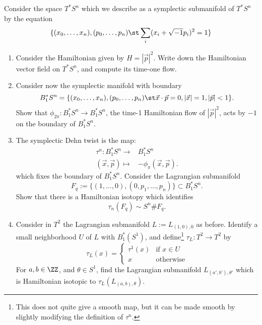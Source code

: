 
 
 
Consider the space $T^*S^n$ which we describe as a symplectic submanifold of $T^*S^n$ by the equation
\[\{(x_0, \ldots, x_n), (p_0, \ldots, p_n) \st \sum_{i} (x_i+\sqrt{-1} p_i)^2=1 \}\]
\begin{enumerate}
    \item Consider the Hamiltonian given by $H=|\vec p|^2$. Write down the Hamiltonian vector field on $T^*S^n$, and compute its time-one flow.
    \item Consider now the symplectic manifold with boundary 
    \[B^*_1S^n=\{(x_0, \ldots, x_n), (p_0, \ldots, p_n) \st\vec x\cdot \vec p =0,|\vec x|=1, |\vec p|<1\}.\]
    Show that $\phi_{2\pi}: B^*_1S^n\to B^*_1 S^n$, the time-1 Hamiltonian flow of $|\vec p|^2$, acts by  $-1$ on the boundary of $B^*_1S^n$. 
    \item The symplectic Dehn twist is the map: 
    \begin{align*}
        \tau^n: B^*_1 S^n\to& B^*_1 S^n\\
            (\vec x, \vec p) \mapsto& -\phi_{\pi}(\vec x, \vec p).
    \end{align*}
    which fixes the boundary of $B^*_1 S^n$.
    Consider the Lagrangian submanifold  
    \[F_q:=\{(1, \ldots, 0), (0, p_1, \ldots, p_n)\}\subset B^*_1S^n.\]
    Show that there is a Hamiltonian isotopy which identifies
    \[\tau_n(F_q)\sim S^n\# F_q.\]
    \item Consider in $T^2$ the Lagrangian submanifold $L:=L_{(1, 0),0}$ as before. Identify a small neighborhood $U$ of $L$ with $B^*_1(S^1)$, and define\footnote{This does not quite give a smooth map, but it can be made smooth by slightly modifying the definition of $\tau^n$.} $\tau_L: T^2\to T^2$ by 
    \[\tau_L(x)=\left\{\begin{array}{cc} \tau^1(x) &\text{if $x\in U$}\\
        x &\text{otherwise}\end{array}\right.\]
    For $a, b\in \ZZ$, and $\theta\in S^1$, find the Lagrangian submanifold $L_{(a', b'), \theta'}$ which is Hamiltonian isotopic to  $\tau_L(L_{(a, b), \theta})$.
\end{enumerate}

 